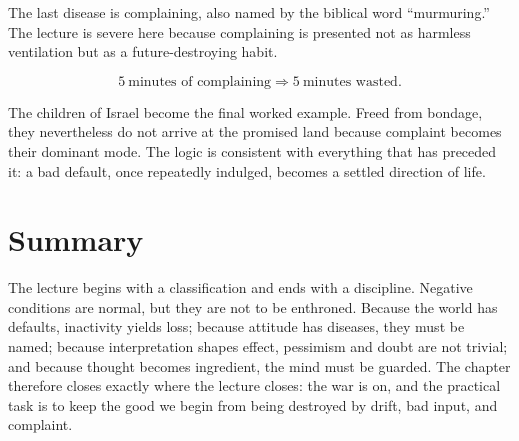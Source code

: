 The last disease is complaining, also named by the biblical word ``murmuring.'' The lecture is severe here because complaining is presented not as harmless ventilation but as a future-destroying habit.

\begin{equation}
5\ \text{minutes of complaining} \Rightarrow 5\ \text{minutes wasted}.
\end{equation}

The children of Israel become the final worked example. Freed from bondage, they nevertheless do not arrive at the promised land because complaint becomes their dominant mode. The logic is consistent with everything that has preceded it: a bad default, once repeatedly indulged, becomes a settled direction of life.

\section{Summary}

The lecture begins with a classification and ends with a discipline. Negative conditions are normal, but they are not to be enthroned. Because the world has defaults, inactivity yields loss; because attitude has diseases, they must be named; because interpretation shapes effect, pessimism and doubt are not trivial; and because thought becomes ingredient, the mind must be guarded. The chapter therefore closes exactly where the lecture closes: the war is on, and the practical task is to keep the good we begin from being destroyed by drift, bad input, and complaint.